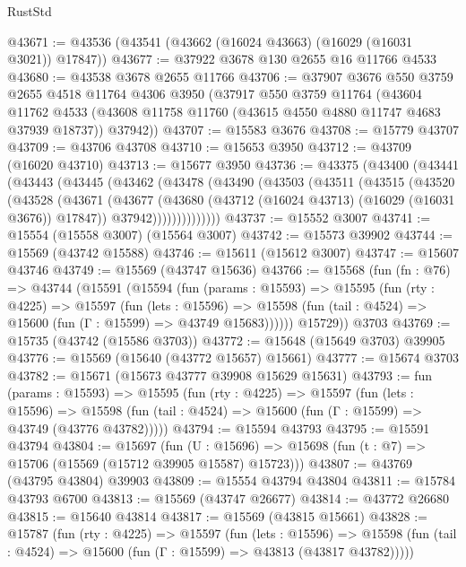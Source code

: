\begin{lexlean}{RustStd}
\begin{coremodule}
@43671 := @43536 (@43541 (@43662 (@16024 @43663) (@16029 (@16031 @3021)) @17847))
@43677 := @37922 @3678 @130 @2655 @16 @11766 @4533
@43680 := @43538 @3678 @2655 @11766
@43706 := @37907
    @3676
    @550
    @3759
    @2655
    @4518
    @11764
    @4306
    @3950
    (@37917
      @550
      @3759
      @11764
      (@43604
        @11762
        @4533
        (@43608 @11758 @11760 (@43615 @4550 @4880 @11747 @4683 @37939 @18737))
        @37942))
@43707 := @15583 @3676
@43708 := @15779 @43707
@43709 := @43706 @43708
@43710 := @15653 @3950
@43712 := @43709 (@16020 @43710)
@43713 := @15677 @3950
@43736 := @43375
    (@43400
      (@43441
        (@43443
          (@43445
            (@43462
              (@43478
                (@43490
                  (@43503
                    (@43511
                      (@43515
                        (@43520
                          (@43528
                            (@43671
                              (@43677
                                (@43680 (@43712 (@16024 @43713) (@16029 (@16031 @3676)) @17847))
                                @37942))))))))))))))
@43737 := @15552 @3007
@43741 := @15554 (@15558 @3007) (@15564 @3007)
@43742 := @15573 @39902
@43744 := @15569 (@43742 @15588)
@43746 := @15611 (@15612 @3007)
@43747 := @15607 @43746
@43749 := @15569 (@43747 @15636)
@43766 := @15568
    (fun (fn : @76) =>
    @43744
      (@15591
        (@15594
          (fun (params : @15593) =>
          @15595
            (fun (rty : @4225) =>
            @15597
              (fun (lets : @15596) =>
              @15598 (fun (tail : @4524) => @15600 (fun (Γ : @15599) => @43749 @15683))))))
        @15729))
    @3703
@43769 := @15735 (@43742 (@15586 @3703))
@43772 := @15648 (@15649 @3703) @39905
@43776 := @15569 (@15640 (@43772 @15657) @15661)
@43777 := @15674 @3703
@43782 := @15671 (@15673 @43777 @39908 @15629 @15631)
@43793 := fun (params : @15593) =>
  @15595
    (fun (rty : @4225) =>
    @15597
      (fun (lets : @15596) =>
      @15598 (fun (tail : @4524) => @15600 (fun (Γ : @15599) => @43749 (@43776 @43782)))))
@43794 := @15594 @43793
@43795 := @15591 @43794
@43804 := @15697
    (fun (U : @15696) => @15698 (fun (t : @7) => @15706 (@15569 (@15712 @39905 @15587) @15723)))
@43807 := @43769 (@43795 @43804) @39903
@43809 := @15554 @43794 @43804
@43811 := @15784 @43793 @6700
@43813 := @15569 (@43747 @26677)
@43814 := @43772 @26680
@43815 := @15640 @43814
@43817 := @15569 (@43815 @15661)
@43828 := @15787
    (fun (rty : @4225) =>
    @15597
      (fun (lets : @15596) =>
      @15598 (fun (tail : @4524) => @15600 (fun (Γ : @15599) => @43813 (@43817 @43782)))))

\end{coremodule}
\end{lexlean}
